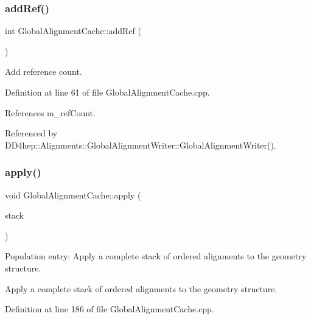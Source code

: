 \subsubsection{\texorpdfstring{add\+Ref()}{addRef()}}
{\footnotesize\ttfamily int Global\+Alignment\+Cache\+::add\+Ref (\begin{DoxyParamCaption}{ }\end{DoxyParamCaption})}



Add reference count. 



Definition at line 61 of file Global\+Alignment\+Cache.\+cpp.



References m\+\_\+ref\+Count.



Referenced by D\+D4hep\+::\+Alignments\+::\+Global\+Alignment\+Writer\+::\+Global\+Alignment\+Writer().

\hypertarget{class_d_d4hep_1_1_alignments_1_1_global_alignment_cache_a9f2812b2517bb488f3d99068fc6f4318}{}\label{class_d_d4hep_1_1_alignments_1_1_global_alignment_cache_a9f2812b2517bb488f3d99068fc6f4318} 
\subsubsection{\texorpdfstring{apply()}{apply()}\hspace{0.1cm}{\footnotesize\ttfamily [1/2]}}
{\footnotesize\ttfamily void Global\+Alignment\+Cache\+::apply (\begin{DoxyParamCaption}\item[{\hyperlink{class_d_d4hep_1_1_alignments_1_1_alignment_stack}{Alignment\+Stack} \&}]{stack }\end{DoxyParamCaption})\hspace{0.3cm}{\ttfamily [protected]}}



Population entry\+: Apply a complete stack of ordered alignments to the geometry structure. 

Apply a complete stack of ordered alignments to the geometry structure. 

Definition at line 186 of file Global\+Alignment\+Cache.\+cpp.



